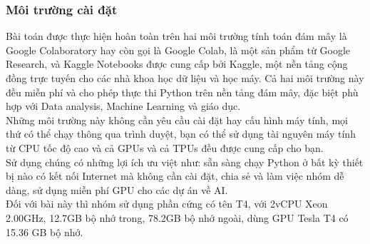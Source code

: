 \subsubsection{Môi trường cài đặt}
Bài toán được thực hiện hoàn toàn trên hai môi trường tính toán đám mây là Google Colaboratory hay còn gọi là Google Colab, là một sản phẩm từ Google Research, và Kaggle Notebooks được cung cấp bởi Kaggle, một nền tảng cộng đồng trực tuyến cho các nhà khoa học dữ liệu và học máy. Cả hai môi trường này đều miễn phí và cho phép thực thi Python trên nền tảng đám mây, đặc biệt phù hợp với Data analysis, Machine Learning và giáo dục.\\
Những môi trường này không cần yêu cầu cài đặt hay cấu hình máy tính, mọi thứ có thể chạy thông qua trình duyệt, bạn có thể sử dụng tài nguyên máy tính từ CPU tốc độ cao và cả GPUs và cả TPUs đều được cung cấp cho bạn.\\
Sử dụng chúng có những lợi ích ưu việt như: sẵn sàng chạy Python ở bất kỳ thiết bị nào có kết nối Internet mà không cần cài đặt, chia sẻ và làm việc nhóm dễ dàng, sử dụng miễn phí GPU cho các dự án về AI. \cite{webpage15}\\
Đối với bài này thì nhóm sử dụng phần cứng có tên T4, với 2vCPU Xeon 2.00GHz, 12.7GB bộ nhớ trong, 78.2GB bộ nhớ ngoài, dùng GPU Tesla T4 có 15.36 GB bộ nhớ.


